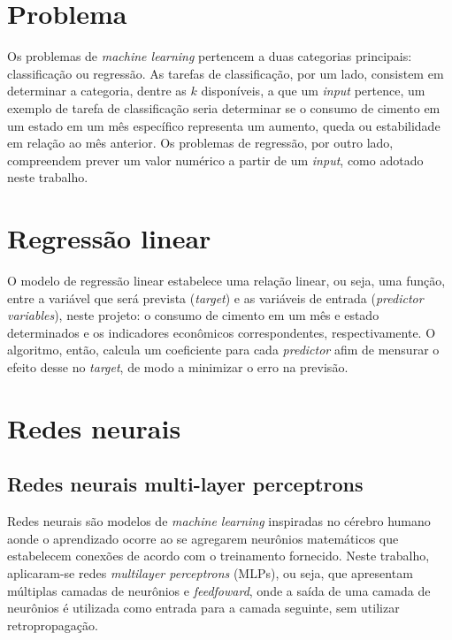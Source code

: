\section*{Problema}

  Os problemas de \textit{machine learning} pertencem a duas categorias principais: classificação ou regressão. As tarefas de classificação, por um lado, consistem em determinar a categoria, dentre as $k$ disponíveis, a que um \textit{input} pertence, um exemplo de tarefa de classificação seria determinar se o consumo de cimento em um estado em um mês específico representa um aumento, queda ou estabilidade em relação ao mês anterior. Os problemas de regressão, por outro lado, compreendem prever um valor numérico a partir de um \textit{input}, \cite{Goodfellow-et-al-2016} como adotado neste trabalho.

  
\section*{Regressão linear}
O modelo de regressão linear estabelece uma relação linear, ou seja, uma função, entre a variável que será prevista (\textit{target}) e as variáveis de entrada (\textit{predictor variables}), neste projeto: o consumo de cimento em um mês e estado determinados e os indicadores econômicos correspondentes, respectivamente. O algoritmo, então, calcula um coeficiente para cada \textit{predictor} afim de mensurar o efeito desse no \textit{target}, de modo a minimizar o erro na previsão.
     
\section*{Redes neurais}

\subsection*{Redes neurais multi-layer perceptrons}
Redes neurais são modelos de \textit{machine learning} inspiradas no cérebro humano aonde o aprendizado ocorre ao se agregarem neurônios matemáticos que estabelecem conexões de acordo com o treinamento fornecido. Neste trabalho, aplicaram-se redes \textit{multilayer perceptrons} (MLPs), ou seja, que apresentam múltiplas camadas de neurônios e \textit{feedfoward}, onde a saída de uma camada de neurônios é utilizada como entrada para a camada seguinte, sem utilizar retropropagação.
          
